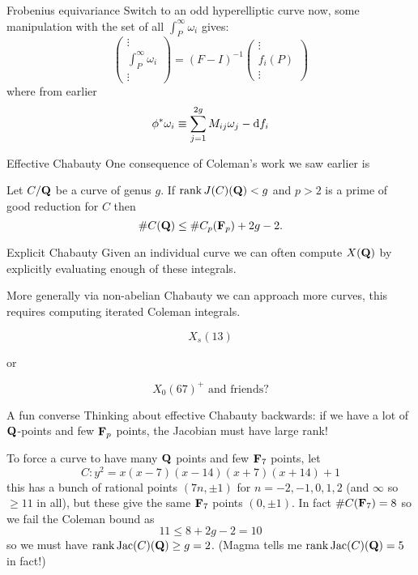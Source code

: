 \begin{frame}{Frobenius equivariance}
    Switch to an odd hyperelliptic curve now, some manipulation with the set of all $\int_P^\infty\omega_i$ gives:
    \begin{equation*}
        \left(\begin{smallmatrix} \vdots \\ \int_{P}^\infty \omega_i \\\vdots \end{smallmatrix}\right) = (F - I)^{-1} \left(\begin{smallmatrix}\vdots \\ f_i(P) \\ \vdots \end{smallmatrix}\right)
    \end{equation*}
    where from earlier
    \[\phi^* \omega_i \equiv \sum_{j=1}^{2g} M_{ij} \omega_j  - \mathop{}\!\mathrm{d} f_i\]
\end{frame}

\begin{frame}{Effective Chabauty}
    One consequence of Coleman's work we saw earlier is
    \begin{theorem}
        Let $C/\mathbf Q$ be a curve of genus $g$. If $\operatorname{rank}J(C)(\mathbf Q)< g$ and $p\gt 2$ is a prime of good reduction for $C$ then
        \[\#C(\mathbf Q) \le \# C_p(\mathbf F_p) + 2g-2\text.\]
    \end{theorem}
\end{frame}

\begin{frame}{Explicit Chabauty}
    Given an individual curve we can often compute $X(\mathbf Q)$ by explicitly evaluating enough of these integrals.\pause

    More generally via non-abelian Chabauty we can approach more curves, \pause this requires computing iterated Coleman integrals.

    \[X_s(13)\] \pause

    or

    \[X_0(67)^+\text{ and friends}?\]

\end{frame}

\begin{frame}{A fun converse}
    Thinking about effective Chabauty backwards: if we have a lot of $\mathbf Q$-points and few $\mathbf F_p$ points, the Jacobian must have large rank!

    \begin{example}
        To force a curve to have many $\mathbf Q$ points and few $\mathbf F_7$ points, let
        \[ C\colon y^2 = x(x-7)(x-14)(x+ 7)(x+14) + 1\]\pause
        this has a bunch of rational points $(7n, \pm 1)$ for $n =-2,-1,0,1,2$ (and $\infty$ so $\ge11$ in all), but these give the same $\mathbf F_7$ points $(0,\pm1)$.
        In fact
        \(\#C(\mathbf F_7) = 8\)
        so we fail the Coleman bound as
        \[ 11 \le 8 + 2g - 2= 10\]
        so we must have $\operatorname{rank} \operatorname{Jac}(C)(\mathbf Q) \ge g =2$.
        (Magma tells me $\operatorname{rank} \operatorname{Jac}(C)(\mathbf Q) = 5$ in fact!)
    \end{example}
\end{frame}

